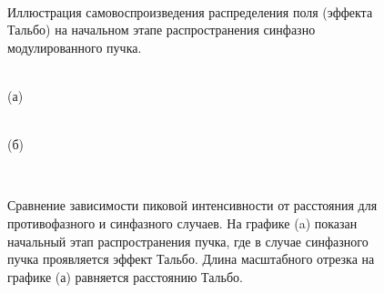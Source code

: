 \begin{figure}[H]
    \begin{center}
        \begin{minipage}{\minipagewidthtwo}
        \end{minipage}
        \hfill
        \begin{minipage}{\minipagewidthtwo}
        \end{minipage}
        \begin{minipage}{\minipagewidthtwo}
        \end{minipage}
        \hfill
        \begin{minipage}{\minipagewidthtwo}
        \end{minipage}
        \\[1ex]
        \caption{Иллюстрация самовоспроизведения распределения поля (эффекта Тальбо) на начальном этапе распространения синфазно модулированного пучка.}
        \label{fig:BeamsTalbo}
    \end{center}
\end{figure}


\begin{figure}[H]
    \begin{center}
        \begin{minipage}{\minipagewidthtwo}
             \\
            \footnotesize{(а)} 
        \end{minipage}
        \hfill
        \begin{minipage}{\minipagewidthtwo}
             \\
            \footnotesize{(б)} 
        \end{minipage}
        \\[1ex]
        \caption{Сравнение зависимости пиковой интенсивности от расстояния для противофазного и синфазного случаев.
                 На графике (a) показан начальный этап распространения пучка, где в случае синфазного пучка проявляется эффект Тальбо.
                 Длина масштабного отрезка на графике (а) равняется расстоянию Тальбо.}
        \label{fig:BeamsImaxOutIn}
    \end{center}
\end{figure}

